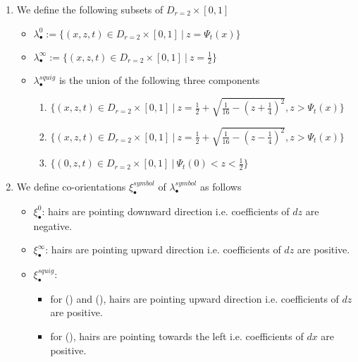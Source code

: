 \begin{definition}
\begin{enumerate}
\item We define the following subsets of $D_{r=2}\times [0,1]$
\begin{itemize}
\item $\lambda_\bullet^0 := \{(x,z,t) \in D_{r=2} \times [0,1] ~|~ z = \Psi_t(x)\}$

\item $\lambda_\bullet^\infty := \{(x,z,t) \in D_{r=2}\times [0,1] ~|~ z = \frac{1}{2} \}$

\item $\lambda_\bullet^{squig}$ is the union of the following three components
\begin{enumerate}[label=(\roman*)]

\item $\{(x,z,t) \in D_{r=2}\times [0,1] ~|~ z = \frac{1}{2} + \sqrt{\frac{1}{16} - (z+\frac{1}{4})^2}, z > \Psi_t(x) \}$

\item $\{(x,z,t) \in D_{r=2}\times [0,1] ~|~ z = \frac{1}{2} + \sqrt{\frac{1}{16} - (z-\frac{1}{4})^2}, z > \Psi_t(x) \}$

\item $\{(0,z,t) \in D_{r=2} \times [0,1] ~|~ \Psi_t(0) < z < \frac{1}{2} \}$
\end{enumerate}
\end{itemize}

\item We define co-orientations $\xi_\bullet^{symbol}$ of $\lambda_\bullet^{symbol}$ as follows
\begin{itemize}
\item $\xi_\bullet^0$: hairs are pointing downward direction i.e. coefficients of $dz$ are negative.

\item $\xi_\bullet^\infty$: hairs are pointing upward direction i.e. coefficients of $dz$ are positive.

\item $\xi_\bullet^{squig}$: 
\begin{itemize}
\item for () and (), hairs are pointing upward direction i.e. coefficients of $dz$ are positive.
\item for (), hairs are pointing towards the left i.e. coefficients of $dx$ are positive.
\end{itemize}
\end{itemize}
\end{enumerate}
\end{definition}

